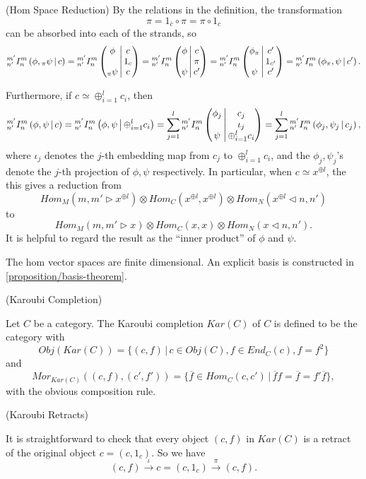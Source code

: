 \begin{remark}\label{remark/hom-space-reduction} (Hom Space Reduction)
  \noindent By the relations in the definition, the transformation
  \[
    \pi = 1_{\overline{c}} \circ \pi = \pi \circ 1_{c}
  \]
  can be absorbed into each of the strands, so
  \[
    {}^{m'}_{n'} I^{m}_{n} \left( \phi, {}_{\pi}\psi \,\middle|\, c \right) =
    {}^{m'}_{n'} I^{m}_{n} \left( \begin{matrix} \phi \\ {}\\ {}_{\pi}\psi \end{matrix} \,\middle|\, \begin{matrix} c \\ 1_{c} \\ c \end{matrix} \right) =
    {}^{m'}_{n'} I^{m}_{n} \left( \begin{matrix} \phi \\ {}\\ \psi \end{matrix} \,\middle|\, \begin{matrix} c \\ \pi \\ c' \end{matrix} \right) =
    {}^{m'}_{n'} I^{m}_{n} \left( \begin{matrix} \phi_{\pi} \\ {}\\ \psi \end{matrix} \,\middle|\, \begin{matrix} c' \\ 1_{c'} \\ c' \end{matrix} \right) =
    {}^{m'}_{n'} I^{m}_{n} \left( \phi_{\pi}, \psi \,\middle|\, c' \right).
  \]

  \noindent Furthermore, if $c \simeq \oplus_{i=1}^{l} c_{i}$, then
  \[
    {}^{m'}_{n'} I^{m}_{n} \left( \phi, \psi \,\middle|\, c \right) = {}^{m'}_{n'} I^{m}_{n} \left( \phi, \psi \,\middle|\, \oplus_{i=1}^{l} c_{i} \right) = \sum_{j=1}^{l} {}^{m'}_{n'} I^{m}_{n} \left( \begin{matrix} \phi_{j} \\ {}\\ \psi \end{matrix} \,\middle|\, \begin{matrix} c_{j} \\ \iota_{j} \\ \oplus_{i=1}^{l} c_{i} \end{matrix} \right) =
    \sum_{j=1}^{l}{}^{m'}_{n'} I^{m}_{n} \left( \phi_{j}, \psi_{j} \,\middle|\, c_{j} \right),
  \]
  where $\iota_{j}$ denotes the $j$-th embedding map from $c_{j}$ to
  $\oplus_{i=1}^{l}c_{i}$, and the $\phi_{j}, \psi_{j}$'s denote the $j$-th
  projection of $\phi, \psi$ respectively. In particular, when
  $c \simeq x^{\oplus l}$, the this gives a reduction from
  \[
    Hom_{M}(m, m' \rhd x^{\oplus l}) \otimes Hom_{C}(x^{\oplus l}, x^{\oplus l}) \otimes Hom_{N} (x^{\oplus l} \lhd n, n')
  \]
  to
  \[
    Hom_{M}(m, m' \rhd x) \otimes Hom_{C}(x, x) \otimes Hom_{N} (x \lhd n, n').
  \]
  It is helpful to regard the result as the ``inner product'' of $\phi$ and $\psi$.
\end{remark}

\noindent The hom vector spaces are finite dimensional. An explicit basis is
constructed in \ref{proposition/basis-theorem}.

\begin{definition} \label{definition/karoubi-completion} (Karoubi Completion)

  \noindent Let $C$ be a category. \quad The Karoubi completion $Kar(C)$ of
  $C$ is defined to be the category with
  \[
    Obj(Kar(C)) = \{(c, f) \,|\, c \in Obj(C), f \in End_{C}(c), f = f^{2}\}
  \] and
  \[
    Mor_{Kar(C)}((c,f), (c', f')) = \{\overline{f} \in Hom_{C}(c,c') \,|\, \overline{f}f = \overline{f} = f'\overline{f}\},
  \]
  with the obvious composition rule.
\end{definition}

\begin{remark} \label{remark/karoubi-retract} (Karoubi Retracts)

  \noindent It is straightforward to check that every object $(c,f)$ in
  $Kar(C)$ is a retract of the original object $c = (c, 1_{c})$. So we have
  \[
    (c, f) \xrightarrow{\iota} c = (c, 1_{c}) \xrightarrow{\pi} (c, f).
  \]
\end{remark}

